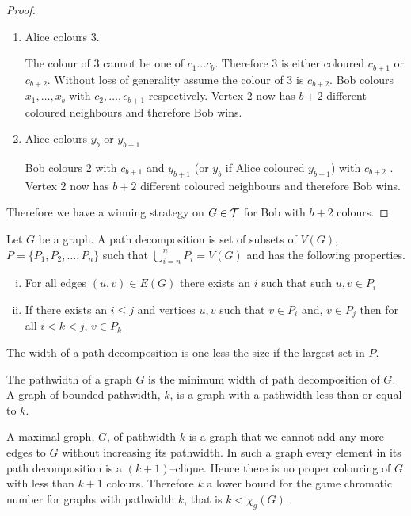 \begin{proof}
\begin{enumerate}
        \item Alice colours $3$.
               
        The colour of $3$ cannot be one of $c_1 \ldots c_{b}$. Therefore $3$ is either coloured $c_{b+1}$ or $c_{b+2}$. 
        Without loss of generality assume the colour of $3$ is $c_{b+2}$.
        Bob colours $x_1, \dots ,x_{b}$ with $c_2,\dots,c_{b+1}$ respectively.
        Vertex $2$ now has $b+2$ different coloured neighbours and therefore Bob wins.  
                       
        \item Alice colours $y_{b}$ or $y_{b+1}$
        
        Bob colours $2$ with $c_{b+1}$ and $y_{b+1}$ (or $y_{b}$ if Alice coloured $y_{b+1}$) with $c_{b+2}$ .
        Vertex $2$ now has $b+2$ different coloured neighbours and therefore Bob wins. 
    \end{enumerate}

    Therefore we have a winning strategy on $G \in\mathcal{T}$ for Bob with $b+2$ colours. 
\end{proof}

\begin{definition}
    Let $G$ be a graph. A path decomposition is set of subsets of $V(G)$, $P=\{P_1,P_2,\dots,P_n\}$ such that $\bigcup_{i=n}^n P_i=V(G)$ and has the following properties.    
    \begin{enumerate}[(i)]
        \item For all edges $(u,v) \in E(G)$ there exists an $i$ such that such $u,v\in P_i$
        \item If there exists an $i\leq j$ and vertices $u,v$ such that $v\in P_i$ and, $v\in P_j$ then for all $i<k<j$, $v\in P_k$
    \end{enumerate}
    The width of a path decomposition is one less the size if the largest set in $P$.
\end{definition}

\begin{definition}[Pathwidth]
    The pathwidth of a graph $G$ is the minimum width of path decomposition of $G$.    
    A graph of bounded pathwidth, $k$, is a graph with a pathwidth less than or equal to $k$. 
\end{definition}

A maximal graph, $G$, of pathwidth $k$ is a graph that we cannot add any more edges to $G$ without increasing its pathwidth. In such a graph every element in its path decomposition is a $(k+1)$--clique. Hence there is no proper colouring of $G$ with less than $k+1$ colours. Therefore $k$ a lower bound for the game chromatic number for graphs with pathwidth $k$, that is $k < \chi_g(G) $. 

